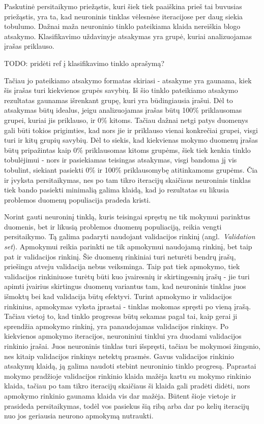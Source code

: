 \documentclass{VUMIFPSbakalaurinis}
\newcommand{\TODO}[1]{
\colorbox{todo-background-color}{TODO: #1}
}
\begin{document}
Paskutinė persitaikymo priežąstis, kuri šiek tiek paaiškina prieš tai buvusias priežąstis, yra ta, kad neuroninis tinklas vėlesnėse iteracijose per daug siekia tobulumo.
Dažnai maža neuroninio tinklo pateikiama klaida nereiškia blogo atsakymo.
Klasifikavimo uždavinyje atsakymas yra grupė, kuriai analizuojamas įrašas priklauso.
\TODO{pridėti ref į klasifikavimo tinklo aprašymą?}
Tačiau jo pateikiamo atsakymo formatas skiriasi - atsakyme yra gaunama, kiek šis įrašas turi kiekvienos grupės savybių.
Iš šio tinklo pateikiamo atsakymo rezultatas gaunamas išrenkant grupę, kuri yra būdingiausia įrašui.
Dėl to atsakymas būtų idealus, jeigu analizuojamas įrašas būtų 100\% priklausomas grupei, kuriai jis priklauso, ir 0\% kitoms.
Tačiau dažnai netgi patys duomenys gali būti tokios prigimties, kad nors jie ir priklauso vienai konkrečiai grupei, visgi turi ir kitų grupių savybių.
Dėl to siekis, kad kiekvienas mokymo duomenų įrašas būtų pripažintas kaip 0\% priklausomas kitoms grupėms, šiek tiek kenkia tinklo tobulėjimui - nors ir pasiekiamas teisingas atsakymas, visgi bandoma jį vis tobulint, siekiant pasiekti 0\% ir 100\% priklausomybę atitinkamoms grupėms.
Čia ir įvyksta persitaikymas, nes po tam tikro iteracijų skaičiaus neuroninis tinklas tiek bando pasiekti minimalią galima klaidą, kad jo rezultatas su likusia problemos duomenų populiacija pradeda kristi.

Norint gauti neuroninį tinklą, kuris teisingai spręstų ne tik mokymui parinktus duomenis, bet ir likusią problemos duomenų populiaciją, reikia vengti persitaikymo.
Tą galima padaryti naudojant validacijos rinkinį (angl.~\textit{Validation set}).
Apmokymui reikia parinkti ne tik apmokymui naudojamą rinkinį, bet taip pat ir validacijos rinkinį.
Šie duomenų rinkiniai turi neturėti bendrų įrašų, priešingu atveju validacija nebus veiksminga.
Taip pat tiek apmokymo, tiek validacijos rinkiniuose turėtų būti kuo įvairesnių ir skirtingesnių įrašų - jie turi apimti įvairius skirtingus duomenų variantus tam, kad neuroninis tinklas juos išmoktų bei kad validacija būtų efektyvi.
Turint apmokymo ir validacijos rinkinius, apmokymas vyksta įprastai - tinklas mokomas spręsti po vieną įrašą.
Tačiau vietoj to, kad tinklo progresas būtų sekamas pagal tai, kaip gerai ji sprendžia apmokymo rinkinį, yra panaudojamas validacijos rinkinys.
Po kiekvienos apmokymo iteracijos, neuroniniui tinklui yra duodami validacijos rinkinio įrašai.
Juos neuroninis tinklas turi išspręsti, tačiau be mokymosi žingsnio, nes kitaip validacijos rinkinys netektų prasmės.
Gavus validacijos rinkinio atsakymų klaidą, ją galima naudoti stebint neuroninio tinklo progresą.
Paprastai mokymo pradžioje validacijos rinkinio klaida mažėja kartu su mokymo rinkinio klaida, tačiau po tam tikro iteracijų skaičiaus ši klaida gali pradėti didėti, nors apmokymo rinkinio gaunama klaida vis dar mažėja.
Būtent šioje vietoje ir prasideda persitaikymas, todėl vos pasiekus šią ribą arba dar po kelių iteracijų nuo jos geriausia neurono apmokymą nutraukti.
\end{document}

